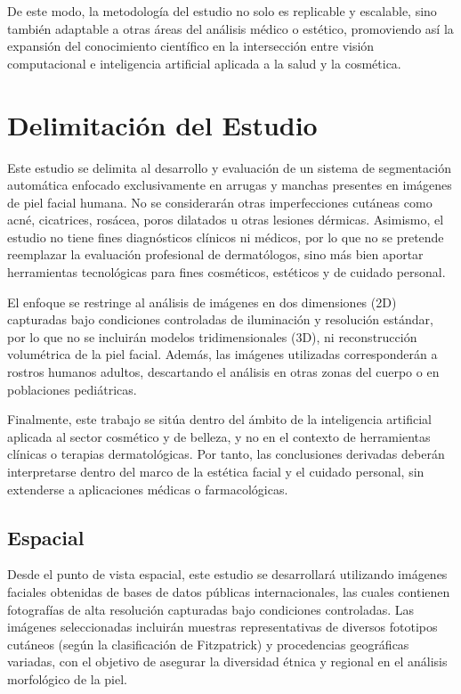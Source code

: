 De este modo, la metodología del estudio no solo es replicable y escalable, sino también adaptable a otras áreas del análisis médico o estético, promoviendo así la expansión del conocimiento científico en la intersección entre visión computacional e inteligencia artificial aplicada a la salud y la cosmética.

\section{Delimitación del Estudio}
Este estudio se delimita al desarrollo y evaluación de un sistema de segmentación automática enfocado exclusivamente en arrugas y manchas presentes en imágenes de piel facial humana. No se considerarán otras imperfecciones cutáneas como acné, cicatrices, rosácea, poros dilatados u otras lesiones dérmicas. Asimismo, el estudio no tiene fines diagnósticos clínicos ni médicos, por lo que no se pretende reemplazar la evaluación profesional de dermatólogos, sino más bien aportar herramientas tecnológicas para fines cosméticos, estéticos y de cuidado personal.

El enfoque se restringe al análisis de imágenes en dos dimensiones (2D) capturadas bajo condiciones controladas de iluminación y resolución estándar, por lo que no se incluirán modelos tridimensionales (3D), ni reconstrucción volumétrica de la piel facial. Además, las imágenes utilizadas corresponderán a rostros humanos adultos, descartando el análisis en otras zonas del cuerpo o en poblaciones pediátricas.

Finalmente, este trabajo se sitúa dentro del ámbito de la inteligencia artificial aplicada al sector cosmético y de belleza, y no en el contexto de herramientas clínicas o terapias dermatológicas. Por tanto, las conclusiones derivadas deberán interpretarse dentro del marco de la estética facial y el cuidado personal, sin extenderse a aplicaciones médicas o farmacológicas.

\subsection{Espacial}
Desde el punto de vista espacial, este estudio se desarrollará utilizando imágenes faciales obtenidas de bases de datos públicas internacionales, las cuales contienen fotografías de alta resolución capturadas bajo condiciones controladas. Las imágenes seleccionadas incluirán muestras representativas de diversos fototipos cutáneos (según la clasificación de Fitzpatrick) y procedencias geográficas variadas, con el objetivo de asegurar la diversidad étnica y regional en el análisis morfológico de la piel.

